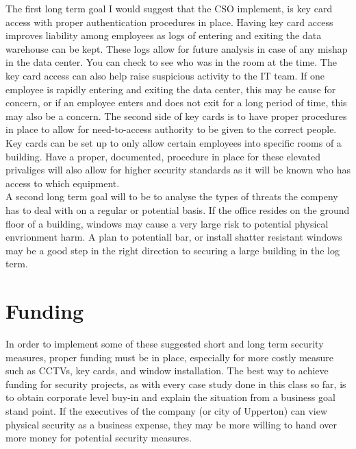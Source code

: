 \documentclass[paper=a4, fontsize=11pt]{scrartcl} %
\numberwithin{equation}{section} %
\numberwithin{figure}{section} %
\numberwithin{table}{section} %
\begin{document}
The first long term goal I would suggest that the CSO implement, is key card access with proper
authentication procedures in place. Having key card access improves liability among employees
as logs of entering and exiting the data warehouse can be kept. These logs allow for future analysis
in case of any mishap in the data center. You can check to see who was in the room at the time.
The key card access can also help raise suspicious activity to the IT team. If one employee
is rapidly entering and exiting the data center, this may be cause for concern, or if an employee
enters and does not exit for a long period of time, this may also be a concern. The second side
of key cards is to have proper procedures in place to allow for need-to-access authority to be
given to the correct people. Key cards can be set up to only allow certain employees into specific
rooms of a building. Have a proper, documented, procedure in place for these elevated privaliges will also
allow for higher security standards as it will be known who has access to which equipment.\\

A second long term goal will to be to analyse the types of threats the compeny has to deal with
on a regular or potential basis. If the office resides on the ground floor of a building, windows
may cause a very large risk to potential physical envrionment harm. A plan to potentiall bar, or
install shatter resistant windows may be a good step in the right direction to securing a large 
building in the log term.

\section {Funding}

In order to implement some of these suggested short and long term security measures, proper
funding must be in place, especially for more costly measure such as CCTVs, key cards, and 
window installation. The best way to achieve funding for security projects, as with every case
study done in this class so far, is to obtain corporate level buy-in and explain the situation
from a business goal stand point. If the executives of the company (or city of Upperton) can
view physical security as a business expense, they may be more willing to hand over more money
for potential security measures.\\
\end{document}
